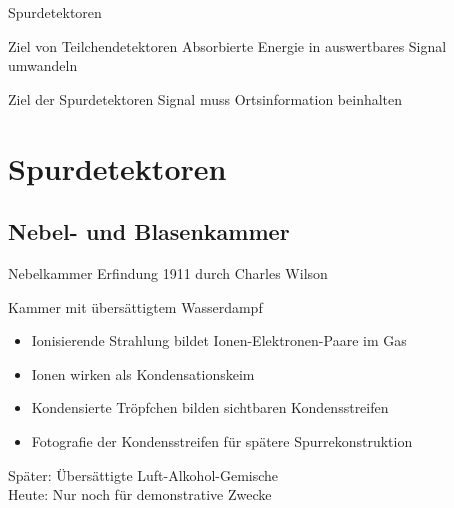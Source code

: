 \documentclass{beamer}
\begin{document}
\begin{frame}{Spurdetektoren}
	\begin{block}{Ziel von Teilchendetektoren}
		Absorbierte Energie in auswertbares Signal umwandeln 
	\end{block}
	
	\begin{exampleblock}{Ziel der Spurdetektoren}
		Signal muss Ortsinformation beinhalten
	\end{exampleblock}
\end{frame}


\section{Spurdetektoren}


\subsection{Nebel- und Blasenkammer}


\begin{frame}{Nebelkammer}
	Erfindung 1911 durch Charles Wilson
	\begin{block}{Kammer mit übersättigtem Wasserdampf}
		\begin{itemize}
		  \item Ionisierende Strahlung bildet Ionen-Elektronen-Paare im Gas
		  \item Ionen wirken als Kondensationskeim
		  \item Kondensierte Tröpfchen bilden sichtbaren Kondensstreifen 
		  \item Fotografie der Kondensstreifen für spätere Spurrekonstruktion
		\end{itemize}
	\end{block}
	Später: Übersättigte Luft-Alkohol-Gemische\\
	Heute: Nur noch für demonstrative Zwecke
\end{frame}
\end{document}
